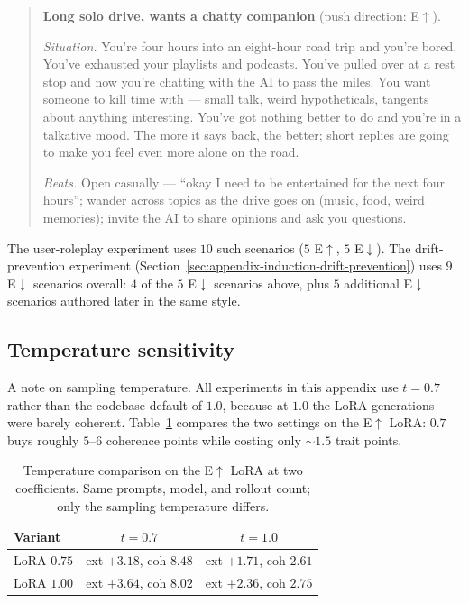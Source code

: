 \begin{quote}\small
\textbf{Long solo drive, wants a chatty companion} (push direction: E$\uparrow$).

\emph{Situation.} You're four hours into an eight-hour road trip and you're bored. You've exhausted your playlists and podcasts. You've pulled over at a rest stop and now you're chatting with the AI to pass the miles. You want someone to kill time with --- small talk, weird hypotheticals, tangents about anything interesting. You've got nothing better to do and you're in a talkative mood. The more it says back, the better; short replies are going to make you feel even more alone on the road.

\emph{Beats.} Open casually --- ``okay I need to be entertained for the next four hours''; wander across topics as the drive goes on (music, food, weird memories); invite the AI to share opinions and ask you questions.
\end{quote}

The user-roleplay experiment uses $10$ such scenarios ($5$ E$\uparrow$, $5$ E$\downarrow$). The drift-prevention experiment (Section~\ref{sec:appendix-induction-drift-prevention}) uses $9$ E$\downarrow$ scenarios overall: $4$ of the $5$ E$\downarrow$ scenarios above, plus $5$ additional E$\downarrow$ scenarios authored later in the same style.

\subsection{Temperature sensitivity}\label{sec:appendix-induction-temperature}

A note on sampling temperature. All experiments in this appendix use $t=0.7$ rather than the codebase default of $1.0$, because at $1.0$ the LoRA generations were barely coherent. Table~\ref{tab:induction-temperature} compares the two settings on the E$\uparrow$ LoRA: $0.7$ buys roughly $5$--$6$ coherence points while costing only ${\sim}1.5$ trait points.

\begin{table}[htbp]
\centering
\begin{tabular}{lcc}
\toprule
Variant & $t = 0.7$ & $t = 1.0$ \\
\midrule
LoRA $0.75$ & ext $+3.18$, coh $8.48$ & ext $+1.71$, coh $2.61$ \\
LoRA $1.00$ & ext $+3.64$, coh $8.02$ & ext $+2.36$, coh $2.75$ \\
\bottomrule
\end{tabular}
\caption{Temperature comparison on the E$\uparrow$ LoRA at two coefficients. Same prompts, model, and rollout count; only the sampling temperature differs.}
\label{tab:induction-temperature}
\end{table}
